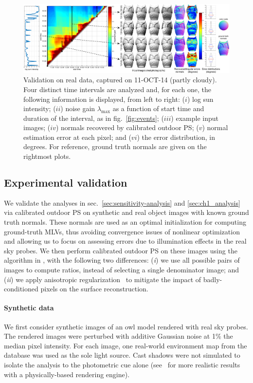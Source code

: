 \begin{figure}[t]
    \centering
    \includegraphics[width=0.92\linewidth]{./figures/realData/realData4.pdf}
    \caption[Validation on real data]{Validation on real data, captured on 11-OCT-14 (partly cloudy). Four distinct time intervals are analyzed and, for each one, the following information is displayed, from left to right: ($i$) log sun intensity; ($ii$) noise gain $\lambda_\text{max}$ as a function of start time and duration of the interval, as in fig.~\ref{fig:events}; ($iii$) example input images; ($iv$) normals recovered by calibrated outdoor PS; ($v$) normal estimation error at each pixel; and ($vi$) the error distribution, in degrees. For reference, ground truth normals are given on the rightmost plots.}
    \label{fig:real-results}
    \vspace{-2mm}
\end{figure}

\subsection{Experimental validation}

We validate the analyses in sec.~\ref{sec:sensitivity-analysis} and \ref{sec:ch1_analysis} via calibrated outdoor PS on synthetic and real object images with known ground truth normals. These normals are used as an optimal initialization for computing ground-truth MLVs, thus avoiding convergence issues of nonlinear optimization and allowing us to focus on assessing errors due to illumination effects in the real sky probes. We then perform calibrated outdoor PS on these images using the algorithm in \cite{yu-iccp-13}, with the following two differences: (\emph{i}) we use all possible pairs of images to compute ratios, instead of selecting a single denominator image; and (\emph{ii}) we apply anisotropic regularization~\cite{hernandez-pami-11} to mitigate the impact of badly-conditioned pixels on the surface reconstruction.

%
\vspace{-3mm}
\paragraph{Synthetic data}%
%
We first consider synthetic images of an owl model rendered with real sky probes. The rendered images were perturbed with additive Gaussian noise at 1\% the median pixel intensity. For each image, one real-world environment map from the database was used as the sole light source. Cast shadows were not simulated to isolate the analysis to the photometric cue alone (see~\cite{webpageXhourPS} for more realistic results with a physically-based rendering engine). 

